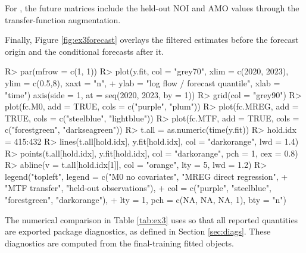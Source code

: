 \documentclass{jss}
\begin{document}
For , the future matrices include the held-out NOI and AMO values through the transfer-function augmentation.

\begin{CodeChunk}
\end{CodeChunk}

Finally, Figure \ref{fig:ex3forecast} overlays the filtered estimates before the forecast
origin and the conditional forecasts after it.

\begin{CodeChunk}
\begin{CodeInput}
R> par(mfrow = c(1, 1))
R> plot(y.fit, col = "grey70", xlim = c(2020, 2023), ylim = c(0.5,8), xaxt = "n",
+      ylab = "log flow / forecast quantile", xlab = "time")
axis(side = 1, at = seq(2020, 2023, by = 1))
R> grid(col = "grey90")
R> plot(fc.M0, add = TRUE, cols = c("purple", "plum"))
R> plot(fc.MREG, add = TRUE, cols = c("steelblue", "lightblue"))
R> plot(fc.MTF, add = TRUE, cols = c("forestgreen", "darkseagreen"))
R> t.all = as.numeric(time(y.fit))
R> hold.idx = 415:432
R> lines(t.all[hold.idx], y.fit[hold.idx], col = "darkorange", lwd = 1.4)
R> points(t.all[hold.idx], y.fit[hold.idx], col = "darkorange", pch = 1, cex = 0.8)
R> abline(v = t.all[hold.idx[1]], col = "orange", lty = 5, lwd = 1.2)
R> legend("topleft", legend = c("M0 no covariates", "MREG direct regression",
+            "MTF transfer", "held-out observations"),
+            col = c("purple", "steelblue", "forestgreen", "darkorange"),
+            lty = 1, pch = c(NA, NA, NA, 1), bty = "n")
\end{CodeInput}
\end{CodeChunk}

The numerical comparison in Table
\ref{tab:ex3} uses  so that all reported quantities
are exported package diagnostics, as defined in Section \ref{sec:diags}. These
diagnostics are computed from the final-training fitted objects.
\end{document}
